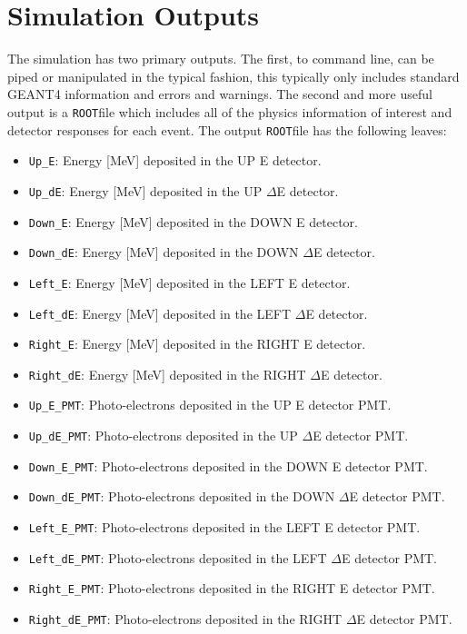 \documentclass[11pt]{article}
\begin{document}
\section*{Simulation Outputs}
The simulation has two primary outputs. The first, to command line, can be piped or manipulated in the typical fashion, this typically only includes standard GEANT4 information and errors and warnings. The second and more useful output is a \texttt{ROOT}file which includes all of the physics information of interest and detector responses for each event. The output \texttt{ROOT}file has the following leaves:
\begin{itemize}
 \item \texttt{Up\_E}: Energy [MeV] deposited in the UP E detector.
 \item \texttt{Up\_dE}: Energy [MeV] deposited in the UP $\Delta$E detector.
 \item \texttt{Down\_E}: Energy [MeV] deposited in the DOWN E detector.
 \item \texttt{Down\_dE}: Energy [MeV] deposited in the DOWN $\Delta$E detector.
 \item \texttt{Left\_E}: Energy [MeV] deposited in the LEFT E detector.
 \item \texttt{Left\_dE}: Energy [MeV] deposited in the LEFT $\Delta$E detector.
 \item \texttt{Right\_E}: Energy [MeV] deposited in the RIGHT E detector.
 \item \texttt{Right\_dE}: Energy [MeV] deposited in the RIGHT $\Delta$E detector.
 \item \texttt{Up\_E\_PMT}: Photo-electrons deposited in the UP E detector PMT.
 \item \texttt{Up\_dE\_PMT}: Photo-electrons deposited in the UP $\Delta$E detector PMT.
 \item \texttt{Down\_E\_PMT}: Photo-electrons deposited in the DOWN E detector PMT.
 \item \texttt{Down\_dE\_PMT}: Photo-electrons deposited in the DOWN $\Delta$E detector PMT.
 \item \texttt{Left\_E\_PMT}: Photo-electrons deposited in the LEFT E detector PMT.
 \item \texttt{Left\_dE\_PMT}: Photo-electrons deposited in the LEFT $\Delta$E detector PMT.
 \item \texttt{Right\_E\_PMT}: Photo-electrons deposited in the RIGHT E detector PMT.
 \item \texttt{Right\_dE\_PMT}: Photo-electrons deposited in the RIGHT $\Delta$E detector PMT.

\end{itemize}
\end{document}
